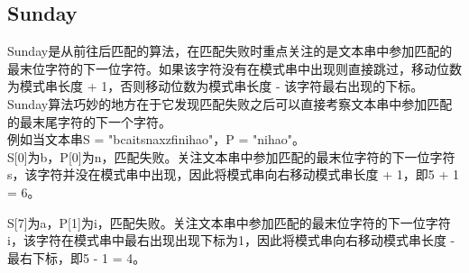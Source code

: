 \subsection{Sunday}

Sunday是从前往后匹配的算法，在匹配失败时重点关注的是文本串中参加匹配的最末位字符的下一位字符。如果该字符没有在模式串中出现则直接跳过，移动位数为模式串长度 + 1，否则移动位数为模式串长度 - 该字符最右出现的下标。 \\

Sunday算法巧妙的地方在于它发现匹配失败之后可以直接考察文本串中参加匹配的最末尾字符的下一个字符。 \\

例如当文本串S = "bcaitsnaxzfinihao"，P = "nihao"。 \\

S[0]为b，P[0]为n，匹配失败。关注文本串中参加匹配的最末位字符的下一位字符s，该字符并没在模式串中出现，因此将模式串向右移动模式串长度 + 1，即5 + 1 = 6。

\begin{table}[H]
	\centering
\end{table}

S[7]为a，P[1]为i，匹配失败。关注文本串中参加匹配的最末位字符的下一位字符i，该字符在模式串中最右出现出现下标为1，因此将模式串向右移动模式串长度 - 最右下标，即5 - 1 = 4。

